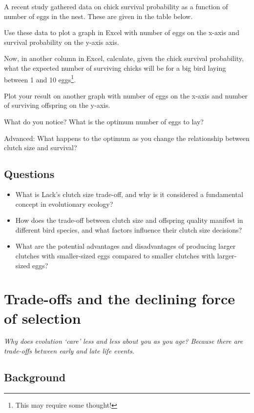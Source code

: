 \documentclass[
  a4paper]{book}
\providecommand{\tightlist}{%
  \setlength{\itemsep}{0pt}\setlength{\parskip}{0pt}}
\begin{document}
A recent study gathered data on chick survival probability as a function of number of eggs in the nest. These are given in the table below.

Use these data to plot a graph in Excel with number of eggs on the x-axis and survival probability on the y-axis axis.

Now, in another column in Excel, calculate, given the chick survival probability, what the expected number of surviving chicks will be for a big bird laying between 1 and 10 eggs\footnote{This may require some thought!}.

Plot your result on another graph with number of eggs on the x-axis and number of surviving offspring on the y-axis.

What do you notice? What is the optimum number of eggs to lay?

Advanced: What happens to the optimum as you change the relationship between clutch size and survival?

\hypertarget{questions-4}{%
\section{Questions}\label{questions-4}}

\begin{itemize}
\tightlist
\item
  What is Lack's clutch size trade-off, and why is it considered a fundamental concept in evolutionary ecology?
\item
  How does the trade-off between clutch size and offspring quality manifest in different bird species, and what factors influence their clutch size decisions?
\item
  What are the potential advantages and disadvantages of producing larger clutches with smaller-sized eggs compared to smaller clutches with larger-sized eggs?
\end{itemize}

\hypertarget{trade-offs-and-the-declining-force-of-selection}{%
\chapter{Trade-offs and the declining force of selection}\label{trade-offs-and-the-declining-force-of-selection}}

\emph{Why does evolution `care' less and less about you as you age? Because there are trade-offs between early and late life events. }

\hypertarget{background-8}{%
\section{Background}\label{background-8}}
\end{document}
